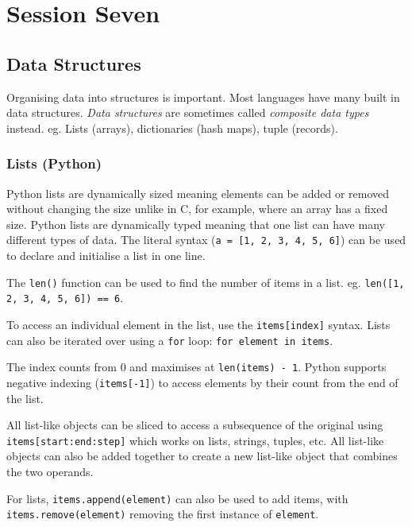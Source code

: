 \section{Session Seven}\label{sec:session_seven}

\subsection{Data Structures}\label{sub:data_structures}

Organising data into structures is important.
Most languages have many built in data structures.
\emph{Data structures} are sometimes called \emph{composite data types} instead.
eg. Lists (arrays), dictionaries (hash maps), tuple (records).

\subsubsection{Lists (Python)}\label{ssub:lists_python_}

Python lists are dynamically sized meaning elements can be added or removed without changing the size unlike in C, for example, where an array has a fixed size.
Python lists are dynamically typed meaning that one list can have many different types of data.
The literal syntax (\texttt{a = [1, 2, 3, 4, 5, 6]}) can be used to declare and initialise a list in one line.

The \texttt{len()} function can be used to find the number of items in a list. eg. \texttt{len([1, 2, 3, 4, 5, 6]) == 6}.

To access an individual element in the list, use the \texttt{items[index]} syntax.
Lists can also be iterated over using a \texttt{for} loop: \texttt{for element in items}.

The index counts from \(0\) and maximises at \texttt{len(items) - 1}.
Python supports negative indexing (\texttt{items[-1]}) to access elements by their count from the end of the list.

All list-like objects can be sliced to access a subsequence of the original using \texttt{items[start:end:step]} which works on lists, strings, tuples, etc.
All list-like objects can also be added together to create a new list-like object that combines the two operands.

For lists, \texttt{items.append(element)} can also be used to add items, with \texttt{items.remove(element)} removing the first instance of \texttt{element}.

